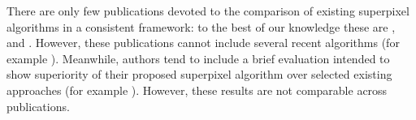 \documentclass[runningheads]{llncs}
\makeatletter
\DeclareRobustCommand\onedot{\futurelet\@let@token\@onedot}
\def\@onedot{\ifx\@let@token.\else.\null\fi\xspace}
\def\etal{{et al}\onedot}
\makeatother
\begin{document}
    
    There are only few publications devoted to the comparison of existing superpixel algorithms in a consistent framework: to the best of our knowledge these are \cite{SchickFischerStiefelhagen:2012}, \cite{AchantaShajiSmithLucchiFuaSuesstrunk:2012} and \cite{NeubertProtzel:2012}. However, these publications cannot include several recent algorithms (for example \cite{VanDenBerghBoixRoigCapitaniVanGool:2012,PaponAbramovSchoelerWoergoetter:2013,WeikersdorferGossowBeetz:2012}). Meanwhile, authors tend to include a brief evaluation intended to show superiority of their proposed superpixel algorithm over selected existing approaches (for example \cite{LiuTuzelRamalingamChellappa:2011,VekslerBoykovMehrani:2010,VanDenBerghBoixRoigCapitaniVanGool:2012,VanDenBerghBoixRoigCapitaniVanGool:2012,WeikersdorferGossowBeetz:2012,PaponAbramovSchoelerWoergoetter:2013}).
    However, these results are not comparable across publications.
    
    
    
\end{document}
